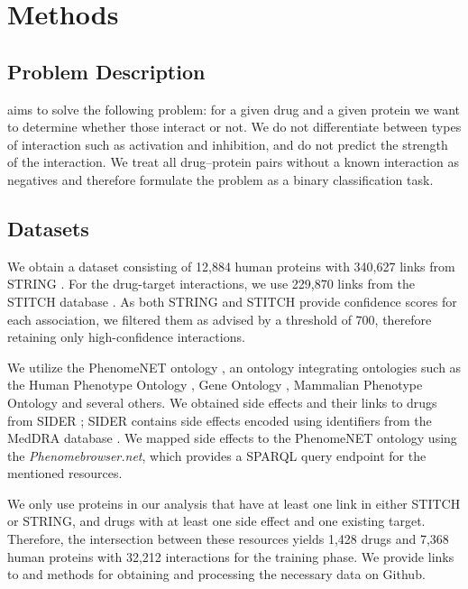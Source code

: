 \documentclass{bioinfo}
\renewcommand{\cite}{\citep}
\begin{document}

\enlargethispage{12pt}

\section{Methods}
\subsection{Problem Description}
\name{} aims to solve the following problem: for a given drug and a
given protein we want to determine whether those interact or not.  We
do not differentiate between types of interaction such as activation
and inhibition, and do not predict the strength of the interaction.
We treat all drug--protein pairs without a known interaction as
negatives and therefore formulate the problem as a binary
classification task.

\subsection{Datasets}
We obtain a dataset consisting of 12,884 human proteins with 
340,627 links from STRING \citep{STRINGv10}. For the drug-target
interactions, we use 229,870 links from the STITCH database
\citep{STITCHv5}. As both STRING and STITCH provide confidence scores
for each association, we filtered them as advised by a threshold of
$700$, therefore retaining only high-confidence interactions.

We utilize the PhenomeNET ontology \citep{PhenomeNET2011}, an ontology
integrating ontologies such as the Human Phenotype Ontology
\citep{HPO2018}, Gene Ontology \cite{GOoriginal2000, GOrecent2020},
Mammalian Phenotype Ontology \citep{MP2009} and several others.  We
obtained side effects and their links to drugs from SIDER
\citep{SIDER}; SIDER contains side effects encoded using identifiers
from the MedDRA database \citep{MedDRA}. We mapped side effects to the
PhenomeNET ontology using the \textit{Phenomebrowser.net}, which
provides a SPARQL \cite{} query endpoint for the mentioned resources.

We only use proteins in our analysis that have at least one link in
either STITCH or STRING, and drugs with at least one side effect and
one existing target. Therefore, the intersection between these
resources yields 1,428 drugs and 7,368 human proteins with 32,212
interactions for the training phase. We provide links to and methods
for obtaining and processing the necessary data on Github.
\end{document}
